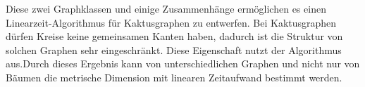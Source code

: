 Diese zwei Graphklassen und einige Zusammenhänge ermöglichen es einen Linearzeit-Algorithmus für Kaktusgraphen zu entwerfen. Bei Kaktusgraphen dürfen Kreise keine gemeinsamen Kanten haben, dadurch ist die Struktur von solchen Graphen sehr eingeschränkt. Diese Eigenschaft nutzt der Algorithmus aus.\newline\newline Durch dieses Ergebnis kann von unterschiedlichen Graphen und nicht nur von Bäumen die metrische Dimension mit linearen Zeitaufwand bestimmt werden.







